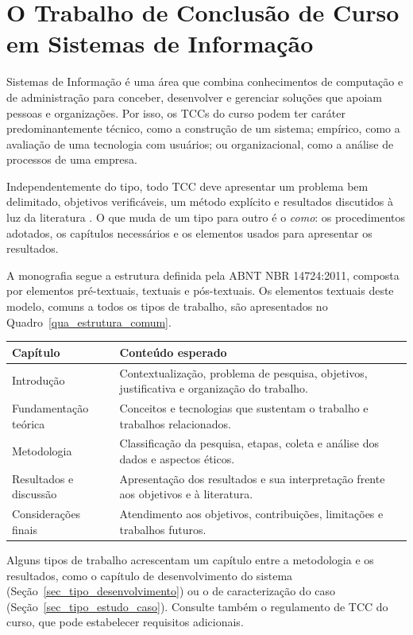 \section{O Trabalho de Conclusão de Curso em Sistemas de Informação}
\label{sec_tcc_si}

Sistemas de Informação é uma área que combina conhecimentos de computação e de administração para conceber, desenvolver e gerenciar soluções que apoiam pessoas e organizações. Por isso, os TCCs do curso podem ter caráter predominantemente técnico, como a construção de um sistema; empírico, como a avaliação de uma tecnologia com usuários; ou organizacional, como a análise de processos de uma empresa.

Independentemente do tipo, todo TCC deve apresentar um problema bem delimitado, objetivos verificáveis, um método explícito e resultados discutidos à luz da literatura \cite{wazlawick2014metodologia}. O que muda de um tipo para outro é o \emph{como}: os procedimentos adotados, os capítulos necessários e os elementos usados para apresentar os resultados.

A monografia segue a estrutura definida pela ABNT NBR 14724:2011, composta por elementos pré-textuais, textuais e pós-textuais. Os elementos textuais deste modelo, comuns a todos os tipos de trabalho, são apresentados no Quadro~\ref{qua_estrutura_comum}.

\begin{quadro}[htb]
	\centering
	\caption{Elementos textuais comuns a todos os tipos de TCC.}
	\label{qua_estrutura_comum}
	\small
	\begin{tabularx}{\textwidth}{|l|X|}
		\hline
		\textbf{Capítulo} & \textbf{Conteúdo esperado} \\ \hline
		Introdução & Contextualização, problema de pesquisa, objetivos, justificativa e organização do trabalho. \\ \hline
		Fundamentação teórica & Conceitos e tecnologias que sustentam o trabalho e trabalhos relacionados. \\ \hline
		Metodologia & Classificação da pesquisa, etapas, coleta e análise dos dados e aspectos éticos. \\ \hline
		Resultados e discussão & Apresentação dos resultados e sua interpretação frente aos objetivos e à literatura. \\ \hline
		Considerações finais & Atendimento aos objetivos, contribuições, limitações e trabalhos futuros. \\ \hline
	\end{tabularx}
\end{quadro}

Alguns tipos de trabalho acrescentam um capítulo entre a metodologia e os resultados, como o capítulo de desenvolvimento do sistema (Seção~\ref{sec_tipo_desenvolvimento}) ou o de caracterização do caso (Seção~\ref{sec_tipo_estudo_caso}). Consulte também o regulamento de TCC do curso, que pode estabelecer requisitos adicionais.
